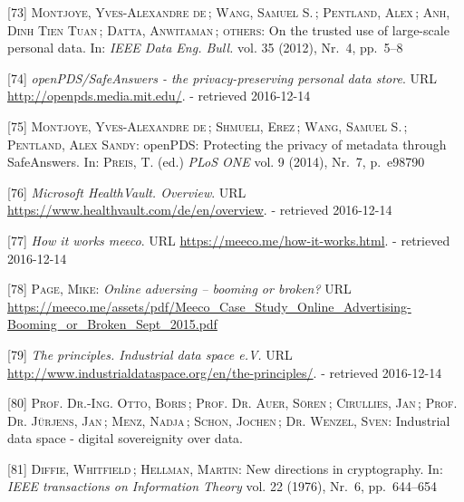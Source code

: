 \documentclass[12pt,english,a4paper,titlepage,cleardoublepage=empty,dottedtoc]{report}
\begin{document}
\hypertarget{ref-paper_2012_openpds_on-trusted-use-of-large-scale-personal-data}{}
{[}73{]} \textsc{Montjoye, Yves-Alexandre de}\,; \textsc{Wang, Samuel
S.}\,; \textsc{Pentland, Alex}\,; \textsc{Anh, Dinh Tien Tuan}\,;
\textsc{Datta, Anwitaman}\,; \textsc{others}: On the trusted use of
large-scale personal data. In: \emph{IEEE Data Eng. Bull.} vol. 35
(2012), Nr.~4, pp.~5--8

\hypertarget{ref-web_mit_openpds-safeanswers-project-page}{}
{[}74{]} \emph{openPDS/SafeAnswers - the privacy-preserving personal
data store}. URL \url{http://openpds.media.mit.edu/}. - retrieved
2016-12-14

\hypertarget{ref-paper_2014_openpds_protecting-privacy-of-meta-data-through-safeanswers}{}
{[}75{]} \textsc{Montjoye, Yves-Alexandre de}\,; \textsc{Shmueli,
Erez}\,; \textsc{Wang, Samuel S.}\,; \textsc{Pentland, Alex Sandy}:
openPDS: Protecting the privacy of metadata through SafeAnswers. In:
\textsc{Preis, T.} (ed.) \emph{PLoS ONE} vol. 9 (2014), Nr.~7, p.~e98790

\hypertarget{ref-web_microsoft_healthvault}{}
{[}76{]} \emph{Microsoft HealthVault. Overview}. URL
\url{https://www.healthvault.com/de/en/overview}. - retrieved 2016-12-14

\hypertarget{ref-web_meeco_how-it-works}{}
{[}77{]} \emph{How it works meeco}. URL
\url{https://meeco.me/how-it-works.html}. - retrieved 2016-12-14

\hypertarget{ref-slides_2015_meeco-case-study}{}
{[}78{]} \textsc{Page, Mike}: \emph{Online adversing -- booming or
broken?} URL
\url{https://meeco.me/assets/pdf/Meeco_Case_Study_Online_Advertising-Booming_or_Broken_Sept_2015.pdf}

\hypertarget{ref-web_industrial-data-space}{}
{[}79{]} \emph{The principles. Industrial data space e.V.} URL
\url{http://www.industrialdataspace.org/en/the-principles/}. - retrieved
2016-12-14

\hypertarget{ref-whitepaper_2016_industrial-data-space}{}
{[}80{]} \textsc{Prof. Dr.-Ing. Otto, Boris}\,; \textsc{Prof. Dr. Auer,
Sören}\,; \textsc{Cirullies, Jan}\,; \textsc{Prof. Dr. Jürjens, Jan}\,;
\textsc{Menz, Nadja}\,; \textsc{Schon, Jochen}\,; \textsc{Dr. Wenzel,
Sven}: Industrial data space - digital sovereignity over data.

\hypertarget{ref-paper_1976_d-h-key-exchange}{}
{[}81{]} \textsc{Diffie, Whitfield}\,; \textsc{Hellman, Martin}: New
directions in cryptography. In: \emph{IEEE transactions on Information
Theory} vol. 22 (1976), Nr.~6, pp.~644--654
\end{document}
